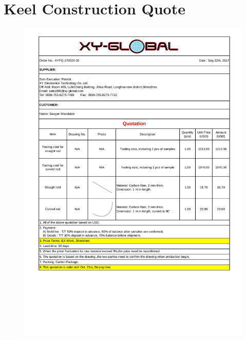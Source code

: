 \documentclass[../main.tex]{subfiles}
\begin{document}
\section{Keel Construction Quote} \label{KEELQUOTE}
\begin{figure}[H]
	\centering
	\includegraphics[width=\textwidth]{img/specs/keelQuote.pdf}
\end{figure}

\end{document}
